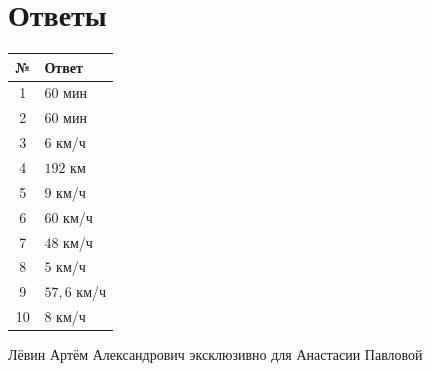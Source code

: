 \documentclass[a4paper,12pt]{article}
\begin{document}
\clearpage
\section*{Ответы}
\renewcommand{\arraystretch}{1.35}
\begin{center}
\begin{tabularx}{\linewidth}{@{}cX@{}}
\toprule
\textbf{№} & \textbf{Ответ} \\
\midrule
1 & \(60\) мин \\
2 & \(60\) мин \\
3 & \(6\) км/ч \\
4 & \(192\) км \\
5 & \(9\) км/ч \\
6 & \(60\) км/ч \\
7 & \(48\) км/ч \\
8 & \(5\) км/ч \\
9 & \(57{,}6\) км/ч \\
10 & \(8\) км/ч \\
\bottomrule
\end{tabularx}
\end{center}

\vfill
\begin{center}
{\small Лёвин Артём Александрович эксклюзивно для Анастасии Павловой}
\end{center}
\end{document}
